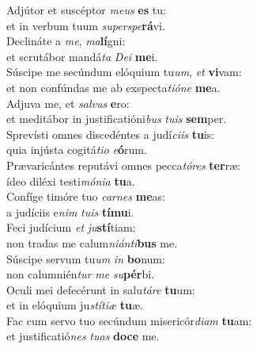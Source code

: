 \evenverse Adjútor et suscéptor \textit{me}\textit{us} \textbf{es} tu:~\*\\
\evenverse et in verbum tuum \textit{su}\textit{per}\textit{spe}\textbf{rá}vi.\\
\oddverse Declináte a \textit{me}, \textit{ma}\textbf{lí}gni:~\*\\
\oddverse et scrutábor mandá\textit{ta} \textit{De}\textit{i} \textbf{me}i.\\
\evenverse Súscipe me secúndum elóquium tu\textit{um}, \textit{et} \textbf{vi}vam:~\*\\
\evenverse et non confúndas me ab exspecta\textit{ti}\textit{ó}\textit{ne} \textbf{me}a.\\
\oddverse Adjuva me, et \textit{sal}\textit{vus} \textbf{e}ro:~\*\\
\oddverse et meditábor in justificatióni\textit{bus} \textit{tu}\textit{is} \textbf{sem}per.\\
\evenverse Sprevísti omnes discedéntes a judí\textit{ci}\textit{is} \textbf{tu}is:~\*\\
\evenverse quia injústa cogitá\textit{ti}\textit{o} \textit{e}\textbf{ó}rum.\\
\oddverse Prævaricántes reputávi omnes pecca\textit{tó}\textit{res} \textbf{ter}ræ:~\*\\
\oddverse ídeo diléxi testi\textit{mó}\textit{ni}\textit{a} \textbf{tu}a.\\
\evenverse Confíge timóre tuo \textit{car}\textit{nes} \textbf{me}as:~\*\\
\evenverse a judíciis e\textit{nim} \textit{tu}\textit{is} \textbf{tí}\textbf{mu}i.\\
\oddverse Feci judícium \textit{et} \textit{ju}\textbf{stí}tiam:~\*\\
\oddverse non tradas me calum\textit{ni}\textit{án}\textit{ti}\textbf{bus} me.\\
\evenverse Súscipe servum tu\textit{um} \textit{in} \textbf{bo}num:~\*\\
\evenverse non calumnién\textit{tur} \textit{me} \textit{su}\textbf{pér}bi.\\
\oddverse Oculi mei defecérunt in salu\textit{tá}\textit{re} \textbf{tu}um:~\*\\
\oddverse et in elóquium ju\textit{stí}\textit{ti}\textit{æ} \textbf{tu}æ.\\
\evenverse Fac cum servo tuo secúndum misericór\textit{di}\textit{am} \textbf{tu}am:~\*\\
\evenverse et justificatió\textit{nes} \textit{tu}\textit{as} \textbf{do}\textbf{ce} me.\\

